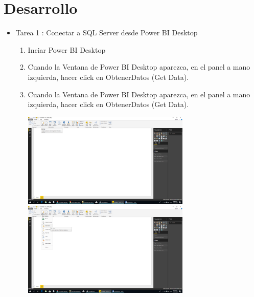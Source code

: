 \section{Desarrollo } 

\begin{itemize}
\item Tarea 1 : Conectar a SQL Server desde Power BI Desktop


\begin{enumerate}
\item Inciar Power BI Desktop
\item Cuando la Ventana de Power BI Desktop aparezca, en el panel a mano izquierda, hacer click en ObtenerDatos (Get Data).
\item Cuando la Ventana de Power BI Desktop aparezca, en el panel a mano izquierda, hacer click en ObtenerDatos (Get Data).

\includegraphics[width=8cm]{./Imagenes/1.png} \includegraphics[width=8cm]{./Imagenes/2.png}


\end{enumerate}
\end{itemize}
